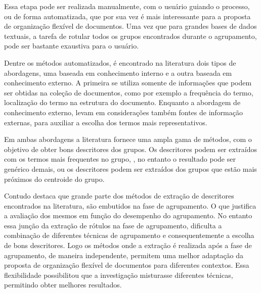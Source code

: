Essa etapa pode ser realizada manualmente, com o usuário guiando o processo, ou de forma
automatizada, que por sua vez é mais interessante para a proposta de organização flexível de
documentos. Uma vez que para grandes bases de dados textuais, a tarefa de rotular todos os grupos
encontrados durante o agrupamento, pode ser bastante exaustiva para o usuário.

Dentre os métodos automatizados, é encontrado na literatura dois tipos de abordagens, uma baseada em
conhecimento interno e a outra baseada em conhecimento externo\cite{Nogueira2013}.  A primeira se
utiliza somente de informações que podem ser obtidas na coleção de documentos, como por exemplo a
frequência do termo, localização do termo na estrutura do documento.  Enquanto a abordagem de
conhecimento externo, levam em considerações também fontes de informação externas, para auxiliar a
escolha dos termos mais representativos. 

Em ambas abordagens a literatura fornece uma ampla gama de métodos, com o objetivo de obter bons
descritores dos grupos. Os descritores podem ser extraídos com os termos mais frequentes no grupo, ,
no entanto o resultado pode ser genérico demais\cite{Pucktada2006}, ou os descritores podem ser
extraídos dos grupos que estão mais próximos do centroide do grupo.

Contudo \cite{Nogueira2013} destaca que grande parte dos métodos de extração de descritores
encontrados na literatura, são embutidos na fase de agrupamento. O que justifica a avaliação dos
mesmos em função do desempenho do agrupamento. No entanto essa junção da extração de rótulos na fase
de agrupamento, dificulta a combinação de diferentes técnicas de agrupamento e consequentemente a
escolha de bons descritores. Logo os métodos onde a extração é realizada após a fase de agrupamento,
de maneira independente, permitem uma melhor adaptação da proposta de organização flexível de
documentos para diferentes contextos. Essa flexibilidade possibilitou que a investigação misturasse
diferentes técnicas, permitindo obter melhores resultados.





